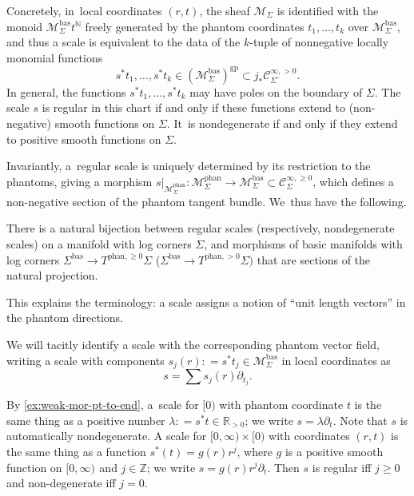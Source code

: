 \documentclass[JEP,XML,SOM,Unicode,NoFloatCountersInSection,published]{cedram}
\theoremstyle{definition}
\theoremstyle{remark}
\newenvironment{example}
  {\pushQED{\qed}\renewcommand{\qedsymbol}{$\lozenge$}\examplex}
  {\popQED\endexamplex}
\newcommand{\RR}{\mathbb{R}}
\newcommand{\NN}{\mathbb{N}}
\newcommand{\ZZ}{\mathbb{Z}}
\newcommand{\halfspc}[1]{[0,\infty)^{#1}}
\renewcommand{\ge}{\geqslant}
\newcommand{\defas}{\mathrel{\mathop:}=}
\newcommand{\cM}{\mathscr{M}}
\newcommand{\cMbas}{\mathscr{M}^{\mathrm{bas}}}
\newcommand{\cMphan}{\mathscr{M}^{\mathrm{phan}}}
\newcommand{\Cinfpos}[1]{\mathscr{C}^{\infty, > 0}_{#1}}
\newcommand{\Cinfge}[1]{\mathscr{C}^{\infty, \ge 0}_{#1}}
\newcommand{\cvf}[1]{\partial_{#1}}
\newcommand{\Sig}{\Sigma}
\newcommand{\bas}[1]{{#1}^{\mathrm{bas}}}
\newcommand{\phant}{\mathrm{phan}}
\newcommand{\Sigbas}{\bas{\Sig}}
\newcommand{\intSig}{\Sigma^\circ}
\newcommand{\tbposphan}[2][]{T^{\phant,>0}_{#1}#2}
\newcommand{\tbgephan}[2][]{T^{\phant,\ge0}_{#1}#2}
\begin{document}
Concretely, in~local coordinates $(r,t)$, the sheaf $\cM_\Sig$ is identified with the monoid $\cMbas_\Sig t^\NN$ freely generated by the phantom coordinates $t_1,\ldots,t_k$ over $\cMbas_\Sig$, and thus a scale is equivalent to the data of the $k$-tuple of nonnegative locally monomial functions
\[
s^*t_1,\ldots,s^*t_k \in (\cMbas_{\Sig})^{\mathrm{gp}}\subset j_*\Cinfpos{\intSig}.
\]
In general, the functions $s^*t_1,\ldots, s^*t_k$ may have poles on the boundary of $\Sig$. The scale $s$ is regular in this chart if and only if these functions extend to (non-negative) smooth functions on $\Sig$. It~is nondegenerate if and only if they extend to positive smooth functions on $\Sig$.

Invariantly, a~regular scale is uniquely determined by its restriction to the phantoms, giving a morphism $s|_{\cMphan_\Sig} \colon \cMphan_{\Sig} \to \cMbas_{\Sig}\subset \Cinfge{\Sig}$, which defines a non-negative section of the phantom tangent bundle. We~thus have the following.
\begin{lemma}
There is a natural bijection between regular scales (respectively, nondegenerate scales) on a manifold with log corners $\Sig$, and morphisms of basic manifolds with log corners $\Sigbas \to \tbgephan{\Sig}$ (\resp $\Sigbas \to \tbposphan{\Sig})$ that are sections of the natural projection.
\end{lemma}

This explains the terminology: a scale assigns a notion of ``unit length vectors'' in the phantom directions.

We will tacitly identify a scale with the corresponding phantom vector field, writing a scale with components $s_j(r) \defas s^*t_j \in \cMbas_{\Sig}$ in local coordinates as
\[
s = \sum s_j(r)\cvf{t_j}.
\]

\begin{example}
By \autoref{ex:weak-mor-pt-to-end}, a~scale for $[0)$ with phantom coordinate $t$ is the same thing as a positive number $\lambda \defas s^*t \in \RR_{>0}$; we write $s = \lambda \cvf{t}$. Note that $s$ is automatically nondegenerate.
\end{example}
\begin{example}
A scale for $[0,\infty)\times [0)$ with coordinates $(r,t)$ is the same thing as a function $s^*(t)=g(r)r^j$, where $g$ is a positive smooth function on $\halfspc{}$ and $j\in\ZZ$; we write $s = g(r)r^j\cvf{t}$. Then $s$ is regular iff $j\ge 0$ and non-degenerate iff $j=0$.
\end{example}
\end{document}
